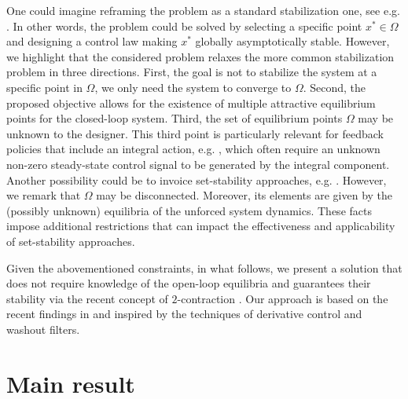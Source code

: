 \documentclass{ifacconf}
\begin{document}
One could imagine reframing the problem as a standard stabilization one, see e.g. \citep{isidori2017stabilization}. In other words, the problem could be solved by selecting a specific point  $x^*\in\Omega$ and designing a control law making $x^*$ globally asymptotically stable. However, we highlight that the considered problem relaxes the more common stabilization problem in three directions. First, the goal is not to stabilize the system at a specific point in $\Omega$, we only need the system to converge to $\Omega$. Second, the proposed objective allows for the existence of multiple attractive equilibrium points for the closed-loop system.  Third, the set of equilibrium points $\Omega$ may be unknown to the designer. This third point is particularly relevant for feedback policies that include an integral action, e.g. \citep{Astolfi2017,GIACCAGLI2023111106}, which often require an unknown non-zero steady-state control signal to be generated by the integral component.
Another possibility could be to invoice set-stability approaches, e.g. \citep{SHIRIAEV20001709}. However, we remark that $\Omega$ may be disconnected. Moreover, its elements are given by the (possibly unknown) equilibria of the unforced system dynamics. These facts impose additional restrictions that can impact the effectiveness and applicability of set-stability approaches. 

Given the abovementioned constraints, in what follows, we present a solution that does not require knowledge of the open-loop equilibria and guarantees their stability via the recent concept of $2$-contraction \citep{Michael1995}. Our approach is based on the recent findings in \citep{ cecilia2023generalized, zoboli2024dynamic} and inspired by the techniques of derivative control and washout filters.



\section{Main result}
\end{document}
